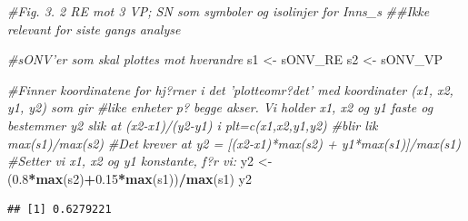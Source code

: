 \documentclass[]{article}
\newenvironment{Shaded}{\begin{snugshade}}{\end{snugshade}}
\newcommand{\CommentTok}[1]{\textcolor[rgb]{0.56,0.35,0.01}{\textit{#1}}}
\newcommand{\FloatTok}[1]{\textcolor[rgb]{0.00,0.00,0.81}{#1}}
\newcommand{\KeywordTok}[1]{\textcolor[rgb]{0.13,0.29,0.53}{\textbf{#1}}}
\newcommand{\NormalTok}[1]{#1}
\newcommand{\OperatorTok}[1]{\textcolor[rgb]{0.81,0.36,0.00}{\textbf{#1}}}
\newcommand{\StringTok}[1]{\textcolor[rgb]{0.31,0.60,0.02}{#1}}
\begin{document}
\begin{Shaded}
\begin{Highlighting}[]
\CommentTok{#Fig. 3. 2 RE mot 3 VP; SN som symboler og isolinjer for Inns_s}
\CommentTok{##Ikke relevant for siste gangs analyse}

\CommentTok{#sONV'er som skal plottes mot hverandre}
\NormalTok{s1 <-}\StringTok{ }\NormalTok{sONV_RE}
\NormalTok{s2 <-}\StringTok{ }\NormalTok{sONV_VP}

\CommentTok{#Finner koordinatene for hj?rner i det 'plotteomr?det' med koordinater (x1, x2, y1, y2) som gir}
\CommentTok{#like enheter p? begge akser. Vi holder x1, x2 og y1 faste og bestemmer y2 slik at (x2-x1)/(y2-y1) i plt=c(x1,x2,y1,y2)}
\CommentTok{#blir lik max(s1)/max(s2)}
\CommentTok{#Det krever at y2 = [(x2-x1)*max(s2) + y1*max(s1)]/max(s1) }
\CommentTok{#Setter vi x1, x2 og y1 konstante, f?r vi:}
\NormalTok{y2 <-}\StringTok{ }\NormalTok{(}\FloatTok{0.8}\OperatorTok{*}\KeywordTok{max}\NormalTok{(s2)}\OperatorTok{+}\FloatTok{0.15}\OperatorTok{*}\KeywordTok{max}\NormalTok{(s1))}\OperatorTok{/}\KeywordTok{max}\NormalTok{(s1)}
\NormalTok{y2}
\end{Highlighting}
\end{Shaded}

\begin{verbatim}
## [1] 0.6279221
\end{verbatim}
\end{document}
